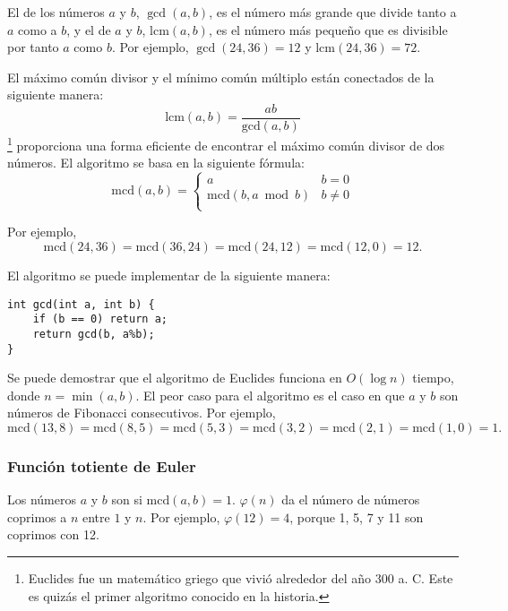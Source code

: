 
El  de
los números $a$ y $b$, $\gcd(a,b)$,
es el número más grande que divide tanto a $a$ como a $b$,
y el  de
$a$ y $b$, $\textrm{lcm}(a,b)$,
es el número más pequeño que es divisible por
tanto $a$ como $b$.
Por ejemplo,
$\gcd(24,36)=12$ y
$\textrm{lcm}(24,36)=72$.

El máximo común divisor y el mínimo común múltiplo
están conectados de la siguiente manera:
\[\textrm{lcm}(a,b)=\frac{ab}{\textrm{gcd}(a,b)}\]
\footnote{Euclides fue un matemático griego que vivió alrededor del año 300 a. C. Este es quizás el primer algoritmo conocido en la historia.} proporciona una forma eficiente de encontrar el máximo común divisor de dos números.
El algoritmo se basa en la siguiente fórmula:
\begin{equation*}
    \textrm{mcd}(a,b) = \begin{cases}
               a        & b = 0\\
               \textrm{mcd}(b,a \bmod b) & b \neq 0\\
           \end{cases}
\end{equation*}

Por ejemplo,
\[\textrm{mcd}(24,36) = \textrm{mcd}(36,24)
= \textrm{mcd}(24,12) = \textrm{mcd}(12,0)=12.\]

El algoritmo se puede implementar de la siguiente manera:
\begin{lstlisting}
int gcd(int a, int b) {
    if (b == 0) return a;
    return gcd(b, a%b);
}
\end{lstlisting}

Se puede demostrar que el algoritmo de Euclides funciona
en $O(\log n)$ tiempo, donde $n=\min(a,b)$.
El peor caso para el algoritmo es
el caso en que $a$ y $b$ son números de Fibonacci consecutivos.
Por ejemplo,
\[\textrm{mcd}(13,8)=\textrm{mcd}(8,5)
=\textrm{mcd}(5,3)=\textrm{mcd}(3,2)=\textrm{mcd}(2,1)=\textrm{mcd}(1,0)=1.\]

\subsubsection{Función totiente de Euler}


Los números $a$ y $b$ son 
si $\textrm{mcd}(a,b)=1$.
 $\varphi(n)$
da el número de números coprimos a $n$
entre $1$ y $n$.
Por ejemplo, $\varphi(12)=4$,
porque 1, 5, 7 y 11
son coprimos con 12.

